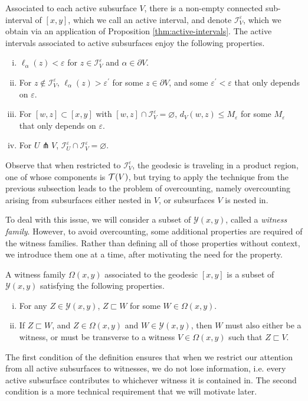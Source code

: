 \documentclass[12pt, reqno]{amsart}
\begin{document}
Associated to each active subsurface $V$, there is a non-empty connected sub-interval of $[x,y]$, which we call an active interval, and denote $\mathcal{I}_V^\varepsilon$, which we obtain via an application of Proposition \ref{thm:active-intervals}.
The active intervals associated to active subsurfaces enjoy the following properties.
\begin{enumerate}[(i)]
\item $\ell_\alpha(z) < \varepsilon$ for $z \in \mathcal{I}_V^\varepsilon$ and $\alpha \in \partial V$.
\item For $z \not \in \mathcal{I}_V^\varepsilon$, $\ell_{\alpha}(z) > \varepsilon^{\prime}$ for some $z \in \partial V$, and some $\varepsilon^{\prime} < \varepsilon$ that only depends on $\varepsilon$.
\item For $[w,z] \subset [x,y]$ with $[w,z] \cap \mathcal{I}_V^\varepsilon = \varnothing$, $d_V(w,z) \leq M_\varepsilon$ for some $M_\varepsilon$ that only depends on $\varepsilon$.
\item For $U \pitchfork V$, $\mathcal{I}_U^\varepsilon \cap \mathcal{I}_V^\varepsilon = \varnothing$.
\end{enumerate}

Observe that when restricted to $\mathcal{I}_V^\varepsilon$, the geodesic is traveling in a product region, one of whose components is $\mathcal{T}(V)$, but trying to apply the technique from the previous subsection leads to the problem of overcounting, namely overcounting arising from subsurfaces either nested in $V$, or subsurfaces $V$ is nested in.

To deal with this issue, we will consider a subset of $\mathcal{Y}(x,y)$, called a \emph{witness family}.
However, to avoid overcounting, some additional properties are required of the witness families.
Rather than defining all of those properties without context, we introduce them one at a time, after motivating the need for the property.

\begin{definition}
  A witness family $\Omega(x,y)$ associated to the geodesic $[x,y]$ is a subset of $\mathcal{Y}(x, y)$ satisfying the following properties.
  \begin{enumerate}[(i)]
  \item For any $Z \in \mathcal{Y}(x,y)$, $Z \sqsubset W$ for some $W \in \Omega(x,y)$.
  \item If $Z \sqsubset W$, and $Z \in \Omega(x,y)$ and $W \in \mathcal{Y}(x,y)$, then $W$ must also either be a witness, or must be transverse to a witness $V \in \Omega(x,y)$ such that $Z \sqsubset V$.
  \end{enumerate}
\end{definition}
The first condition of the definition ensures that when we restrict our attention from all active subsurfaces to witnesses, we do not lose information, i.e. every active subsurface contributes to whichever witness it is contained in.
{\color{red} The second condition is a more technical requirement that we will motivate later.}
\end{document}
